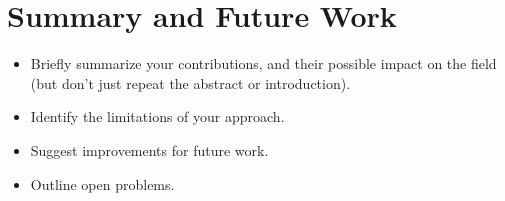 \documentclass[10pt]{article}
\begin{document}
\section{Summary and Future Work}
\begin{itemize}
\item Briefly summarize your contributions, and their possible
impact on the field (but don't just repeat the abstract or introduction).
\item Identify the limitations of your approach.
\item Suggest improvements for future work.
\item Outline open problems.
\end{itemize}



\end{document}

